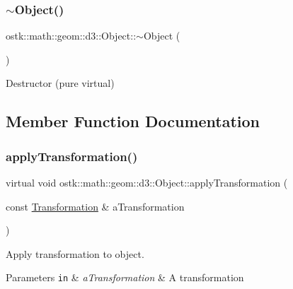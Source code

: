 \subsubsection{\texorpdfstring{$\sim$\+Object()}{~Object()}}
{\footnotesize\ttfamily ostk\+::math\+::geom\+::d3\+::\+Object\+::$\sim$\+Object (\begin{DoxyParamCaption}{ }\end{DoxyParamCaption})\hspace{0.3cm}{\ttfamily [pure virtual]}}



Destructor (pure virtual) 



\subsection{Member Function Documentation}
\mbox{\label{classostk_1_1math_1_1geom_1_1d3_1_1_object_ae9194dd6d2bb4df09292ffc84dccdb1d}} 
\subsubsection{\texorpdfstring{apply\+Transformation()}{applyTransformation()}}
{\footnotesize\ttfamily virtual void ostk\+::math\+::geom\+::d3\+::\+Object\+::apply\+Transformation (\begin{DoxyParamCaption}\item[{const \hyperlink{classostk_1_1math_1_1geom_1_1d3_1_1_transformation}{Transformation} \&}]{a\+Transformation }\end{DoxyParamCaption})\hspace{0.3cm}{\ttfamily [pure virtual]}}



Apply transformation to object. 


\begin{DoxyParams}[1]{Parameters}
\mbox{\tt in}  & {\em a\+Transformation} & A transformation \\
\hline
\end{DoxyParams}


